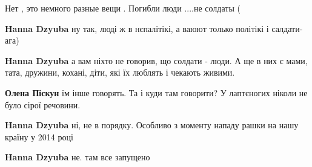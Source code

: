 \begin{itemize}
\begin{itemize}
\begin{itemize}
Нет , это немного разные вещи . Погибли люди ....не солдаты (

 
\textbf{Hanna Dzyuba} ну так, люді ж в нєпалітікі, а ваюют только політікі і салдати- ага)

 
\textbf{Hanna Dzyuba} а вам ніхто не говорив, що солдати - люди. А ще в них є мами, тата, дружини, кохані, діти, які їх люблять і чекають живими.

 
\textbf{Олена Піскун} їм інше говорять. Та і куди там говорити? У лаптєногих ніколи не було сірої речовини.

 
\textbf{Hanna Dzyuba} ні, не в порядку. Особливо з моменту нападу рашки на нашу країну у 2014 році

 
\textbf{Hanna Dzyuba} не. там все запущено
\end{itemize}

 

\end{itemize}
\end{itemize}
